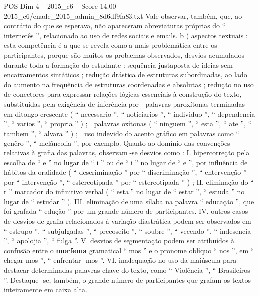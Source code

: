 \begin{textsample}{POS Dim 4 – 2015\_c6 – Score 14.00 – 2015\_c6/enade\_2015\_admin\_8d6df9fa83.txt}
Vale observar, também, que, ao contrário do que se esperava, não apareceram abreviaturas próprias do “ internetês ”, relacionado ao uso de redes sociais e emails. b ) aspectos textuais : esta competência é a que se revela como a mais problemática entre os participantes, porque são muitos os problemas observados, desvios acumulados durante toda a formação do estudante : sequência justaposta de ideias sem encaixamentos sintáticos ; redução drástica de estruturas subordinadas, ao lado do aumento na frequência de estruturas coordenadas e absolutas ; redução no uso de conectores para expressar relações lógicas essenciais à construção do texto, substituídas pela exigência de inferência por  palavras paroxítonas terminadas em ditongo crescente ( “ necessario ”, “ noticiarios ”, “ individuo ”, “ dependencia ”, “ varios ”, “ propria ” ) ;  palavras oxítonas ( “ ninguem ”, “ esta ”, “ ate ”, “ tambem ”, “ alvara ” ) ;  uso indevido do acento gráfico em palavras como “ genêro ”, “ melâncolia ”, por exemplo.
Quanto ao domínio das convenções relativas à grafia das palavras, observam -se desvios como : I. hipercorreção pela escolha de “ e ” no lugar de “ i ” ou de “ i ” no lugar de “ e ”, por influência de hábitos da oralidade ( “ descriminação ” por “ discriminação ”, “ entervenção ” por “ intervenção ”, “ estereotipada ” por “ estereotipada ” ) ; II. eliminação do “ r ” marcador do infinitivo verbal ( “ esta ” no lugar de “ estar ”, “ estuda ” no lugar de “ estudar ” ).
III. eliminação de uma sílaba na palavra “ educação ”, que foi grafada “ edução ” por um grande número de participantes.
IV. outros casos de desvios de grafia relacionados à variação diastrática podem ser observados em “ estrupo ”, “ subjulgadas ”, “ precoseito ”, “ soubre ”, “ vecendo ”, “ indesencia ”, “ apolojia ”, “ fulga ”.
V. desvios de segmentação podem ser atribuídos à confusão entre o \textbf{morfema} gramatical “ mos ” e o pronome oblíquo “ nos ”, em “ chegar mos ”, “ enfrentar -mos ”.
VI. inadequação no uso da maiúscula para destacar determinadas palavras-chave do texto, como “ Violência ”, “ Brasileiros ”.
Destaque -se, também, o grande número de participantes que grafam os textos inteiramente em caixa alta.

\end{textsample}
